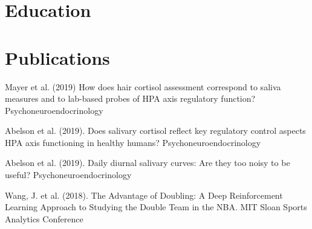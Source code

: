 \documentclass[letterpaper]{twentysecondcv} %
\begin{document}
\begin{twenty}
\end{twenty}



\section{Education}

\begin{twenty} %
\end{twenty}


\section{Publications}

Mayer et al. (2019) How does hair cortisol assessment correspond to saliva measures and to lab-based probes of HPA axis regulatory function? Psychoneuroendocrinology

Abelson et al. (2019). Does salivary cortisol reflect key regulatory control aspects HPA axis functioning in healthy humans? Psychoneuroendocrinology

Abelson et al. (2019). Daily diurnal salivary curves: Are they too noisy to be useful? Psychoneuroendocrinology

Wang, J. et al. (2018). The Advantage of Doubling: A Deep Reinforcement Learning Approach to Studying the Double Team in the NBA. MIT Sloan Sports Analytics Conference
	
\end{document}

